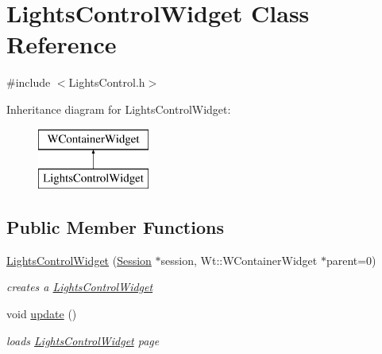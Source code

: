 \hypertarget{class_lights_control_widget}{}\section{Lights\+Control\+Widget Class Reference}
\label{class_lights_control_widget}


{\ttfamily \#include $<$Lights\+Control.\+h$>$}

Inheritance diagram for Lights\+Control\+Widget\+:\begin{figure}[H]
\begin{center}
\leavevmode
\includegraphics[height=2.000000cm]{class_lights_control_widget}
\end{center}
\end{figure}
\subsection*{Public Member Functions}
\begin{DoxyCompactItemize}
\item 
\hyperlink{class_lights_control_widget_a15e1439f70466b481134b8eba8f3cd5d}{Lights\+Control\+Widget} (\hyperlink{class_session}{Session} $\ast$session, Wt\+::\+W\+Container\+Widget $\ast$parent=0)
\begin{DoxyCompactList}\small\item\em creates a \hyperlink{class_lights_control_widget}{Lights\+Control\+Widget} \end{DoxyCompactList}\item 
void \hyperlink{class_lights_control_widget_a595489c5a7076eeaf32fee9d48bbd1fe}{update} ()
\begin{DoxyCompactList}\small\item\em loads \hyperlink{class_lights_control_widget}{Lights\+Control\+Widget} page \end{DoxyCompactList}\end{DoxyCompactItemize}

